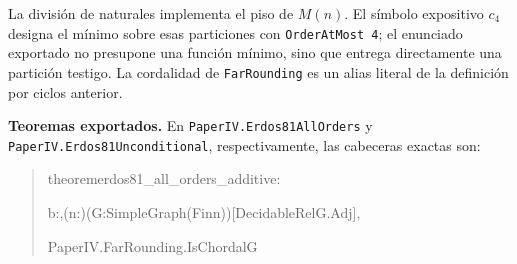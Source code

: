 \documentclass[spanish,11pt,a4paper]{article}
\newlength{\LeanCharWidth}
\begin{document}
La división de naturales implementa el piso de \(M(n)\). El símbolo
expositivo \(c_4\) designa el mínimo sobre esas particiones con
\texttt{OrderAtMost\ 4}; el enunciado exportado no presupone una función
mínimo, sino que entrega directamente una partición testigo. La
cordalidad de \nolinkurl{FarRounding} es un alias literal de la definición
por ciclos anterior.

\textbf{Teoremas exportados.} En \nolinkurl{PaperIV.Erdos81AllOrders} y
\nolinkurl{PaperIV.Erdos81Unconditional}, respectivamente, las cabeceras
exactas son:

\begin{quote}\fontsize{8.5}{10.2}\selectfont\ttfamily\raggedright\setlength{\parskip}{0pt}\settowidth{\LeanCharWidth}{0}
\noindent theorem\hspace*{\dimexpr 1\LeanCharWidth\relax}erdos81\_all\_orders\_additive\hspace*{\dimexpr 1\LeanCharWidth\relax}:\par
\noindent \hspace*{\dimexpr 4\LeanCharWidth\relax}{\LeanSymbols ∃}\hspace*{\dimexpr 1\LeanCharWidth\relax}b\hspace*{\dimexpr 1\LeanCharWidth\relax}:\hspace*{\dimexpr 1\LeanCharWidth\relax}{\LeanSymbols ℕ},\hspace*{\dimexpr 1\LeanCharWidth\relax}{\LeanSymbols ∀}\hspace*{\dimexpr 1\LeanCharWidth\relax}(n\hspace*{\dimexpr 1\LeanCharWidth\relax}:\hspace*{\dimexpr 1\LeanCharWidth\relax}{\LeanSymbols ℕ})\hspace*{\dimexpr 1\LeanCharWidth\relax}(G\hspace*{\dimexpr 1\LeanCharWidth\relax}:\hspace*{\dimexpr 1\LeanCharWidth\relax}SimpleGraph\hspace*{\dimexpr 1\LeanCharWidth\relax}(Fin\hspace*{\dimexpr 1\LeanCharWidth\relax}n))\hspace*{\dimexpr 1\LeanCharWidth\relax}[DecidableRel\hspace*{\dimexpr 1\LeanCharWidth\relax}G.Adj],\par
\noindent \hspace*{\dimexpr 6\LeanCharWidth\relax}PaperIV.FarRounding.IsChordal\hspace*{\dimexpr 1\LeanCharWidth\relax}G\hspace*{\dimexpr 1\LeanCharWidth\relax}{\LeanSymbols →}\par

\end{quote}
\end{document}
